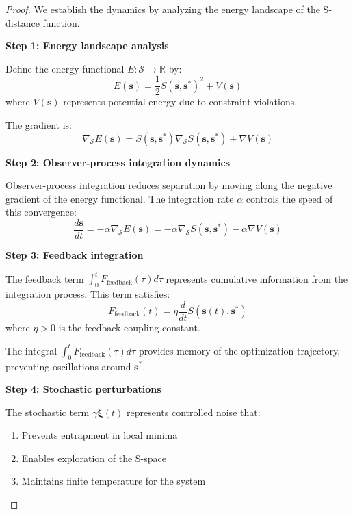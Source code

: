 \documentclass[12pt,a4paper]{article}
\begin{document}
\begin{proof}
We establish the dynamics by analyzing the energy landscape of the S-distance function.

\textbf{Step 1: Energy landscape analysis}

Define the energy functional $E: \mathcal{S} \to \mathbb{R}$ by:
\begin{equation}
E(\mathbf{s}) = \frac{1}{2} S(\mathbf{s}, \mathbf{s}^*)^2 + V(\mathbf{s})
\end{equation}
where $V(\mathbf{s})$ represents potential energy due to constraint violations.

The gradient is:
\begin{equation}
\nabla_{\mathcal{S}} E(\mathbf{s}) = S(\mathbf{s}, \mathbf{s}^*) \nabla_{\mathcal{S}} S(\mathbf{s}, \mathbf{s}^*) + \nabla V(\mathbf{s})
\end{equation}

\textbf{Step 2: Observer-process integration dynamics}

Observer-process integration reduces separation by moving along the negative gradient of the energy functional. The integration rate $\alpha$ controls the speed of this convergence:
\begin{equation}
\frac{d\mathbf{s}}{dt} = -\alpha \nabla_{\mathcal{S}} E(\mathbf{s}) = -\alpha \nabla_{\mathcal{S}} S(\mathbf{s}, \mathbf{s}^*) - \alpha \nabla V(\mathbf{s})
\end{equation}

\textbf{Step 3: Feedback integration}

The feedback term $\int_0^t F_{\text{feedback}}(\tau) d\tau$ represents cumulative information from the integration process. This term satisfies:
\begin{equation}
F_{\text{feedback}}(t) = \eta \frac{d}{dt} S(\mathbf{s}(t), \mathbf{s}^*)
\end{equation}
where $\eta > 0$ is the feedback coupling constant.

The integral $\int_0^t F_{\text{feedback}}(\tau) d\tau$ provides memory of the optimization trajectory, preventing oscillations around $\mathbf{s}^*$.

\textbf{Step 4: Stochastic perturbations}

The stochastic term $\gamma \mathbf{\xi}(t)$ represents controlled noise that:
\begin{enumerate}
\item Prevents entrapment in local minima
\item Enables exploration of the S-space
\item Maintains finite temperature for the system
\end{enumerate}


\end{proof}
\end{document}

